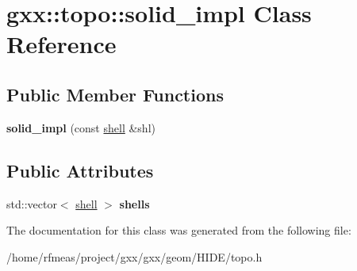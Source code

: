 \hypertarget{classgxx_1_1topo_1_1solid__impl}{}\section{gxx\+:\+:topo\+:\+:solid\+\_\+impl Class Reference}
\label{classgxx_1_1topo_1_1solid__impl}
\subsection*{Public Member Functions}
\begin{DoxyCompactItemize}
\item 
{\bfseries solid\+\_\+impl} (const \hyperlink{classgxx_1_1topo_1_1shell}{shell} \&shl)\hypertarget{classgxx_1_1topo_1_1solid__impl_a8a5d48c08f255d8409ea2f847c1c86bb}{}\label{classgxx_1_1topo_1_1solid__impl_a8a5d48c08f255d8409ea2f847c1c86bb}

\end{DoxyCompactItemize}
\subsection*{Public Attributes}
\begin{DoxyCompactItemize}
\item 
std\+::vector$<$ \hyperlink{classgxx_1_1topo_1_1shell}{shell} $>$ {\bfseries shells}\hypertarget{classgxx_1_1topo_1_1solid__impl_a3c1435e11d2796ff27cd8e8d9be77711}{}\label{classgxx_1_1topo_1_1solid__impl_a3c1435e11d2796ff27cd8e8d9be77711}

\end{DoxyCompactItemize}


The documentation for this class was generated from the following file\+:\begin{DoxyCompactItemize}
\item 
/home/rfmeas/project/gxx/gxx/geom/\+H\+I\+D\+E/topo.\+h\end{DoxyCompactItemize}
